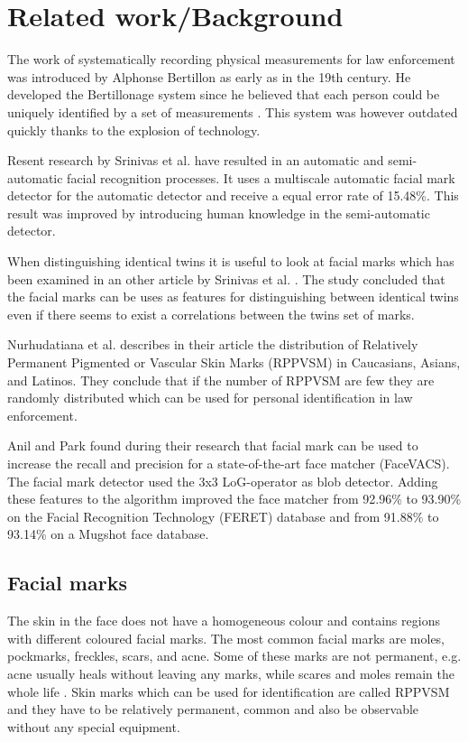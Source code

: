 \chapter{Related work/Background }
The work of systematically recording physical measurements for law enforcement was introduced by Alphonse Bertillon as early as in the 19th century. He developed the Bertillonage system since he believed that each person could be uniquely identified by a set of measurements \cite{Bertillon}. This system was however outdated quickly thanks to the explosion of technology.

Resent research by Srinivas et al. \cite{automatic_detector_2015} have resulted in an automatic and semi-automatic facial recognition processes. It uses a multiscale automatic facial mark detector for the automatic detector and receive a equal error rate of 15.48\%. This result was improved by introducing human knowledge in the semi-automatic detector.

When distinguishing identical twins it is useful to look at facial marks which has been examined in an other article by Srinivas et al. \cite{twins}. The study concluded that the facial marks can be uses as features for distinguishing between identical twins even if there seems to exist a correlations between the twins set of marks.

Nurhudatiana et al. \cite{statistic_RPPVSM} describes in their article the distribution of Relatively Permanent Pigmented or Vascular Skin Marks (RPPVSM) in Caucasians, Asians, and Latinos. They conclude that if the number of RPPVSM are few they are randomly distributed which can be used for personal identification in law enforcement. 

Anil and Park found during their research \cite{jain_facial} that facial mark can be used to increase the recall and precision for a state-of-the-art face matcher (FaceVACS). The facial mark detector used the 3x3 LoG-operator as blob detector. Adding these features to the algorithm improved the face matcher from  92.96\% to 93.90\% on the Facial Recognition Technology (FERET) database and from 91.88\% to 93.14\% on a Mugshot face database. 




\section{Facial marks}
The skin in the face does not have a homogeneous colour and contains regions with different coloured facial marks. The most common facial marks are moles, pockmarks, freckles, scars, and acne. Some of these marks are not permanent, e.g. acne usually heals without leaving any marks, while scares and moles remain the whole life    \cite{automatic_detector_2015}. Skin marks which can be used for identification are called RPPVSM and they have to be relatively permanent, common and also be observable without any special equipment. \cite{statistic_RPPVSM}